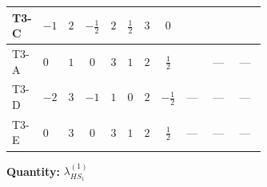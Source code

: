 \documentclass[8pt]{article}
\begin{document}
\begin{landscape}
\begin{longtable}{@{}llcccccc >{\raggedright\arraybackslash}p{0.21\linewidth} >{\raggedright\arraybackslash}p{0.21\linewidth} >{\raggedright\arraybackslash}p{0.21\linewidth}@{}}
\midrule
T3-C & $-1$ & $2$ & $-\frac{1}{2}$ & $2$ & $\frac{1}{2}$ & $3$ & $0$ & \scriptsize\adjustbox{max width=\linewidth}{$\begin{gathered} {\lambda_{HS_1}^{(1)}} (6 \operatorname{Tr}\!\left({Y_d}\,\left({Y_d}\right)^{\dagger}\right)+2 \operatorname{Tr}\!\left({Y_e}\,\left({Y_e}\right)^{\dagger}\right)+6 \operatorname{Tr}\!\left({Y_u}\,\left({Y_u}\right)^{\dagger}\right))\end{gathered}$} & \scriptsize\adjustbox{max width=\linewidth}{$\begin{gathered} +24 {\lambda_7} \left({\lambda_7}\right)^{*}\end{gathered}$} & \scriptsize\adjustbox{max width=\linewidth}{$\begin{gathered} +3 {\lambda_{11}} \left({\lambda_{H H^\dagger S_1^\dagger S_2^\dagger}^{\rm Cross}}\right)^{*}\end{gathered}$} \\
\midrule
T3-A & $0$ & $1$ & $0$ & $3$ & $1$ & $2$ & $\frac{1}{2}$ & \scriptsize\adjustbox{max width=\linewidth}{$\begin{gathered} {\lambda_{HS_1}^{(1)}} (6 \operatorname{Tr}\!\left({Y_d}\,\left({Y_d}\right)^{\dagger}\right)+2 \operatorname{Tr}\!\left({Y_e}\,\left({Y_e}\right)^{\dagger}\right)+6 \operatorname{Tr}\!\left({Y_u}\,\left({Y_u}\right)^{\dagger}\right))\end{gathered}$} & --- & --- \\
\midrule
T3-D & $-2$ & $3$ & $-1$ & $1$ & $0$ & $2$ & $-\frac{1}{2}$ & --- & --- & --- \\
\midrule
T3-E & $0$ & $3$ & $0$ & $3$ & $1$ & $2$ & $\frac{1}{2}$ & --- & --- & --- \\
\midrule
\bottomrule
\end{longtable}
\clearpage
\noindent\textbf{Quantity: }$\lambda_{HS_1}^{(1)}$\par\smallskip

\end{landscape}
\end{document}
